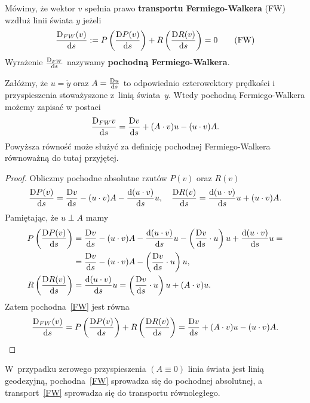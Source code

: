 \begin{definition}Mówimy, że wektor $v$ spełnia prawo \textbf{transportu 
Fermiego-Walkera} (FW) wzdłuż linii świata $y$ jeżeli
\begin{align} 
\frac{\text{D}_{FW} (v)}{\text{d} s}  :=  P \left(\frac{\text{D} P(v)}{\text{d} s} \right) +
R \left( \frac{\text{D} R(v)}{\text{d} s} \right) = 0
\tag{FW} \label{FW}
\end{align}
Wyrażenie $ \frac{{\text{D}}_{FW} }{\text{d} s}$ nazywamy \textbf{pochodną
Fermiego-Walkera}. 
\end{definition}
\begin{theorem}
Załóżmy, że $u = \dot{y}$ oraz $A=\frac{\text{D} u}{\text{d} s}$ 
to odpowiednio czterowektory
prędkości i przyspieszenia stoważyszone z~linią świata~$y$.
Wtedy pochodną Fermiego-Walkera możemy zapisać w postaci
\begin{align} 
\frac{\text{D}_{FW} v}{\text{d} s}   = 
\frac{\text{D} v}{\text{d} s} +
(A\cdot v) u - (u\cdot v) A.
\end{align}
Powyższa równość może służyć za definicję
pochodnej Fermiego-Walkera~\cite{synge1960} 
równoważną do tutaj przyjętej.
\end{theorem}
\begin{proof}
Obliczmy pochodne absolutne rzutów $P(v)$ oraz $R(v)$
\begin{align*}
\frac{\text{D} P(v)}{\text{d} s} = \frac{\text{D} v}{\text{d} s} - (u\cdot v) A  
- \frac{\text{d} (u \cdot v)}{\text{d} s} u, \quad
\frac{\text{D} R(v)}{\text{d} s} =\frac{\text{d} (u \cdot v)}{\text{d} s} u + (u\cdot v) A .
\end{align*}
Pamiętając, że $u \perp A$ mamy
\begin{align*}
P \left( \frac{\text{D} P(v)}{\text{d} s}  \right) 
&= \frac{\text{D} v}{\text{d} s} - (u\cdot v) A  
- \frac{\text{d} (u \cdot v)}{\text{d} s} u 
-\left(\frac{\text{D} v}{\text{d} s} \cdot u \right)u 
+ \frac{\text{d} (u \cdot v)}{\text{d} s} u =\\
&= \frac{\text{D} v}{\text{d} s} - (u\cdot v) A  
-\left(\frac{\text{D} v}{\text{d} s} \cdot u \right)u ,\\
R\left( \frac{\text{D} R(v)}{\text{d} s} \right) 
&=\frac{\text{d} (u \cdot v)}{\text{d} s} u  = 
\left(\frac{\text{D} v}{\text{d} s} \cdot u \right)u 
+ (A\cdot v)u .
\end{align*}
Zatem pochodna~\ref{FW} jest równa 
\begin{align} 
\frac{\text{D}_{FW} (v)}{\text{d} s} = P \left(\frac{\text{D} P(v)}{\text{d} s} \right) +
R \left( \frac{\text{D} R(v)}{\text{d} s} \right) = 
\frac{\text{D} v}{\text{d} s} +
(A\cdot v) u - (u\cdot v) A.
\end{align}
\end{proof}
W~przypadku zerowego przyspieszenia $(A\equiv 0)$ linia świata
jest linią geodezyjną, pochodna~\eqref{FW} sprowadza się 
do pochodnej absolutnej, a transport~\eqref{FW} sprowadza się 
do transportu równoległego. 

